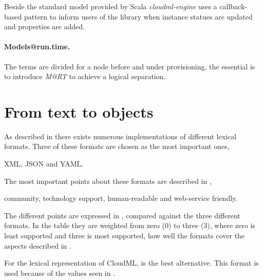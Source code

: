 Beside the standard model provided by Scala \emph{cloudml-engine} uses
a callback-based pattern to inform users of the library when instance statues
are updated and properties are added.

\paragraph{Models@run.time.}

The terms are divided for a node before and under provisioning, the essential is to introduce 
\emph{M@RT} to achieve a logical separation.

\section{From text to objects}


As described in  there exists numerous implementations of different lexical formats.
Three of these formats are chosen as the most important ones,
\begin{ii}
  \iitem XML,
  \iitem JSON and
  \iitem YAML.
\end{ii}
The most important points about these formats are described in ,
\ie
\begin{ii}
  \iitem community,
  \iitem technology support,
  \iitem human-readable and
  \iitem web-service friendly.
\end{ii}
The different points are expressed in , 
compared against the three different formats.
In the table they are weighted from zero ($0$) to three ($3$),
where zero is least supported and three is most supported,
\ie how well the formats cover the aspects described in .

For the lexical representation of CloudML,  is the best alternative.
This format is used because of the values seen in .

